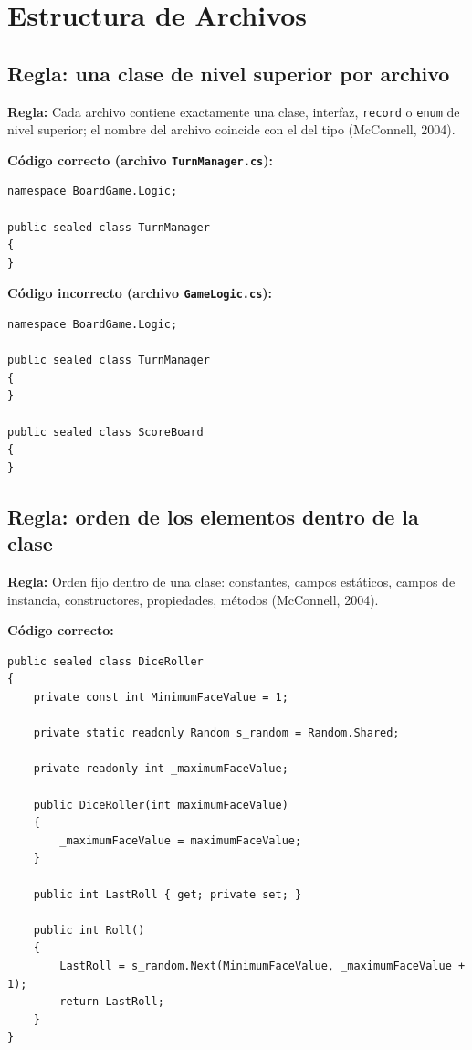 \section{Estructura de Archivos}

\subsection{Regla: una clase de nivel superior por archivo}

\textbf{Regla:} Cada archivo contiene exactamente una clase, interfaz, \texttt{record} o \texttt{enum} de nivel superior; el nombre del archivo coincide con el del tipo (McConnell, 2004).

\textbf{Código correcto (archivo \texttt{TurnManager.cs}):}
\begin{lstlisting}[style=csharpstyle]
namespace BoardGame.Logic;

public sealed class TurnManager
{
}
\end{lstlisting}

\textbf{Código incorrecto (archivo \texttt{GameLogic.cs}):}
\begin{lstlisting}[style=csharpstyle]
namespace BoardGame.Logic;

public sealed class TurnManager
{
}

public sealed class ScoreBoard
{
}
\end{lstlisting}

\subsection{Regla: orden de los elementos dentro de la clase}

\textbf{Regla:} Orden fijo dentro de una clase: constantes, campos estáticos, campos de instancia, constructores, propiedades, métodos (McConnell, 2004).

\textbf{Código correcto:}
\begin{lstlisting}[style=csharpstyle]
public sealed class DiceRoller
{
    private const int MinimumFaceValue = 1;

    private static readonly Random s_random = Random.Shared;

    private readonly int _maximumFaceValue;

    public DiceRoller(int maximumFaceValue)
    {
        _maximumFaceValue = maximumFaceValue;
    }

    public int LastRoll { get; private set; }

    public int Roll()
    {
        LastRoll = s_random.Next(MinimumFaceValue, _maximumFaceValue + 1);
        return LastRoll;
    }
}
\end{lstlisting}

